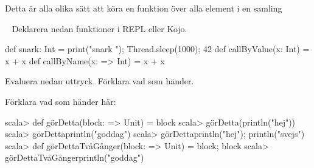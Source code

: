 \Subtask {}

\Subtask {}



\SOLUTION


\TaskSolved \what

Detta är alla olika sätt att köra en funktion över alla element i en samling

\SubtaskSolved  {}

\SubtaskSolved  {}

\SubtaskSolved  {}

\SubtaskSolved  {}

\SubtaskSolved  {}

\SubtaskSolved  {}

\SubtaskSolved  {}

\SubtaskSolved  {}



\QUESTEND












\QUESTBEGIN

\Task  \what~  Deklarera nedan funktioner i REPL eller Kojo.

\begin{Code}
def snark: Int = {print("snark "); Thread.sleep(1000); 42}
def callByValue(x: Int) = x + x
def callByName(x: => Int) = x + x
\end{Code}

Evaluera nedan uttryck. Förklara vad som händer.

\Subtask {}

\Subtask {}

\Subtask {}

\Subtask {}

\Subtask {}

\Subtask {}


\Subtask Förklara vad som händer här:
\begin{REPL}
scala> def görDetta(block: => Unit) = block
scala> görDetta(println("hej"))
scala> görDetta{println("goddag")}
scala> görDetta{println("hej"); println("svejs")}
scala> def görDettaTvåGånger(block: => Unit) = {block; block}
scala> görDettaTvåGånger{println("goddag")}
\end{REPL}


